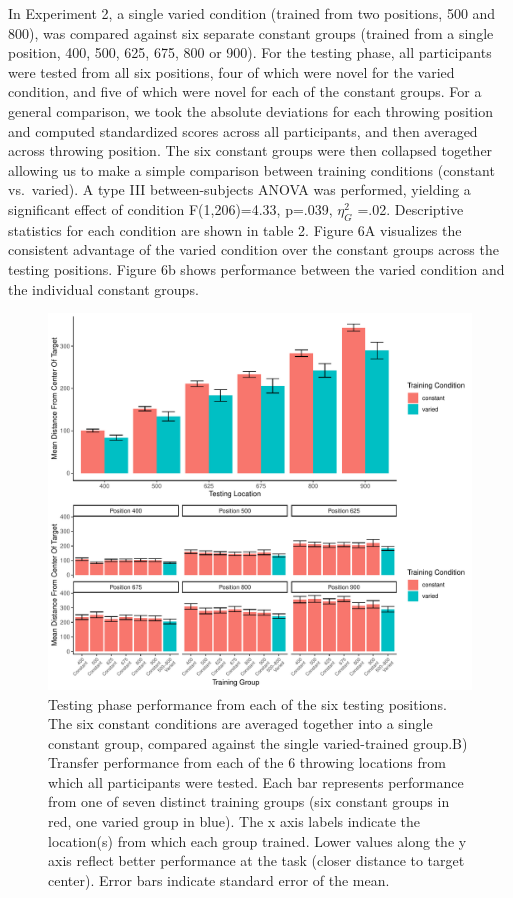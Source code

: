 \documentclass[
  jou, donotrepeattitle,floatsintext]{apa7}
\begin{document}
In Experiment 2, a single varied condition (trained from two positions, 500 and 800), was compared against six separate constant groups (trained from a single position, 400, 500, 625, 675, 800 or 900). For the testing phase, all participants were tested from all six positions, four of which were novel for the varied condition, and five of which were novel for each of the constant groups. For a general comparison, we took the absolute deviations for each throwing position and computed standardized scores across all participants, and then averaged across throwing position. The six constant groups were then collapsed together allowing us to make a simple comparison between training conditions (constant vs.~varied). A type III between-subjects ANOVA was performed, yielding a significant effect of condition F(1,206)=4.33, p=.039, \(\eta^{2}_G\) =.02. Descriptive statistics for each condition are shown in table 2. Figure 6A visualizes the consistent advantage of the varied condition over the constant groups across the testing positions. Figure 6b shows performance between the varied condition and the individual constant groups.



\begin{figure}
\includegraphics[width=\textwidth]{IGAS_PJ_files/figure-latex/e2test1-1} \caption{Testing phase performance from each of the six testing positions. The six constant conditions are averaged together into a single constant group, compared against the single varied-trained group.B) Transfer performance from each of the 6 throwing locations from which all participants were tested. Each bar represents performance from one of seven distinct training groups (six constant groups in red, one varied group in blue). The x axis labels indicate the location(s) from which each group trained. Lower values along the y axis reflect better performance at the task (closer distance to target center). Error bars indicate standard error of the mean.}\label{fig:e2test1}
\end{figure}
\end{document}

